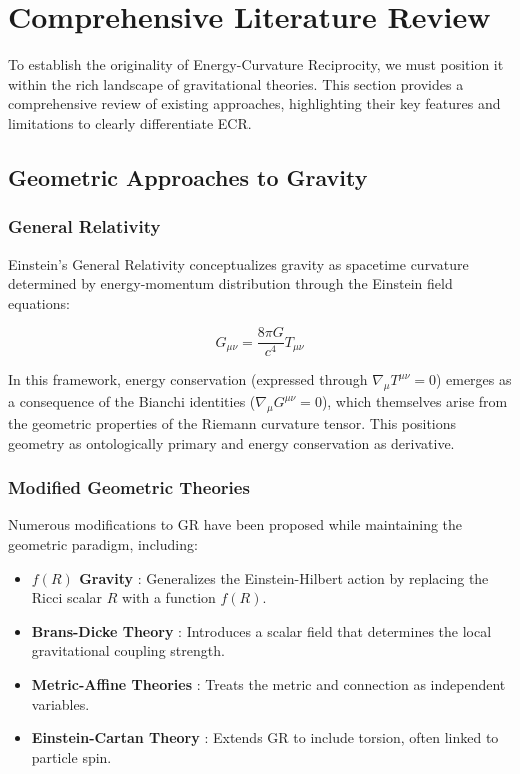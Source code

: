 \documentclass[11pt,a4paper]{article}
\begin{document}
\section{Comprehensive Literature Review}\label{sec:literature}

To establish the originality of Energy-Curvature Reciprocity, we must position it within the rich landscape of gravitational theories. This section provides a comprehensive review of existing approaches, highlighting their key features and limitations to clearly differentiate ECR.

\subsection{Geometric Approaches to Gravity}

\subsubsection{General Relativity}

Einstein's General Relativity \cite{einstein1916} conceptualizes gravity as spacetime curvature determined by energy-momentum distribution through the Einstein field equations:

\begin{equation}
    G_{\mu\nu} = \frac{8\pi G}{c^4}T_{\mu\nu}
\end{equation}

In this framework, energy conservation (expressed through $\nabla_\mu T^{\mu\nu} = 0$) emerges as a consequence of the Bianchi identities ($\nabla_\mu G^{\mu\nu} = 0$), which themselves arise from the geometric properties of the Riemann curvature tensor. This positions geometry as ontologically primary and energy conservation as derivative.

\subsubsection{Modified Geometric Theories}

Numerous modifications to GR have been proposed while maintaining the geometric paradigm, including:

\begin{itemize}
    \item \textbf{$f(R)$ Gravity} \cite{sotiriou2010}: Generalizes the Einstein-Hilbert action by replacing the Ricci scalar $R$ with a function $f(R)$.
    
    \item \textbf{Brans-Dicke Theory} \cite{brans1961}: Introduces a scalar field that determines the local gravitational coupling strength.
    
    \item \textbf{Metric-Affine Theories} \cite{hehl1995}: Treats the metric and connection as independent variables.
    
    \item \textbf{Einstein-Cartan Theory} \cite{hehl1976}: Extends GR to include torsion, often linked to particle spin.
\end{itemize}
\end{document}
